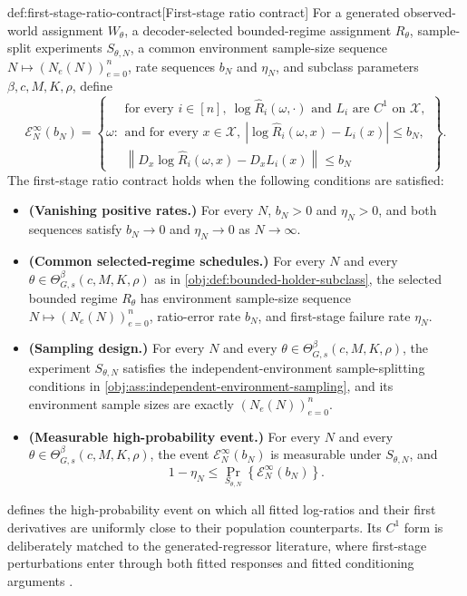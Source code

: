 \documentclass[11pt]{article}
\begin{document}
\begin{definitionv}{def:first-stage-ratio-contract}[First-stage ratio contract]
For a generated observed-world assignment \(W_\theta\), a decoder-selected bounded-regime assignment \(R_\theta\), sample-split experiments \(S_{\theta,N}\), a common environment sample-size sequence \(N\mapsto (N_e(N))_{e=0}^n\), rate sequences \(b_N\) and \(\eta_N\), and subclass parameters \(\beta,c,M,K,\rho\), define
\[
\mathcal E_N^{\infty}(b_N)
=
\left\{
\omega:
\begin{array}{l}
\text{for every } i\in[n],\ 
\log \widehat R_i(\omega,\cdot)\text{ and }L_i\text{ are }C^1\text{ on }\mathcal X,\\
\text{and for every }x\in\mathcal X,\ 
\left|\log \widehat R_i(\omega,x)-L_i(x)\right|\le b_N,\\
\left\|D_x\log \widehat R_i(\omega,x)-D_xL_i(x)\right\|\le b_N
\end{array}
\right\}.
\]
The first-stage ratio contract holds when the following conditions are satisfied:
\begin{itemize}
\item \textbf{(Vanishing positive rates.)} For every \(N\), \(b_N>0\) and \(\eta_N>0\), and both sequences satisfy \(b_N\to0\) and \(\eta_N\to0\) as \(N\to\infty\).
\item \textbf{(Common selected-regime schedules.)} For every \(N\) and every \(\theta\in\Theta^{\beta}_{G,s}(c,M,K,\rho)\) as in \cref{obj:def:bounded-holder-subclass}, the selected bounded regime \(R_\theta\) has environment sample-size sequence \(N\mapsto (N_e(N))_{e=0}^n\), ratio-error rate \(b_N\), and first-stage failure rate \(\eta_N\).
\item \textbf{(Sampling design.)} For every \(N\) and every \(\theta\in\Theta^{\beta}_{G,s}(c,M,K,\rho)\), the experiment \(S_{\theta,N}\) satisfies the independent-environment sample-splitting conditions in \cref{obj:ass:independent-environment-sampling}, and its environment sample sizes are exactly \((N_e(N))_{e=0}^n\).
\item \textbf{(Measurable high-probability event.)} For every \(N\) and every \(\theta\in\Theta^{\beta}_{G,s}(c,M,K,\rho)\), the event \(\mathcal E_N^{\infty}(b_N)\) is measurable under \(S_{\theta,N}\), and
\[
1-\eta_N
\le
\Pr_{S_{\theta,N}}\left\{\mathcal E_N^{\infty}(b_N)\right\}.
\]
\end{itemize}
\end{definitionv}

 defines the high-probability event  on which all fitted log-ratios and their first derivatives are uniformly close to their population counterparts. Its \(C^1\) form is deliberately matched to the generated-regressor literature, where first-stage perturbations enter through both fitted responses and fitted conditioning arguments \citep{Pagan1984,MammenRotheSchienle2012GeneratedCovariates,Lee2018PartialMeanGeneratedRegressors}.
\end{document}
